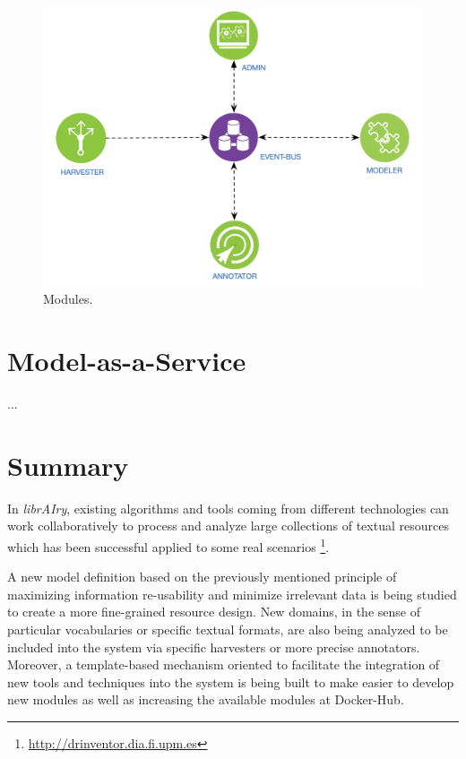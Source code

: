 \begin{figure}
  \includegraphics[scale=0.25]{modules}
  \caption{Modules.}
  \label{fig:librairy-modules}
\end{figure}


\section{Model-as-a-Service}
...

\section{Summary}

In \textit{librAIry}, existing algorithms and tools coming from different technologies can work collaboratively to process and analyze large collections of textual resources which has been successful applied to some real scenarios \footnote{\url{http://drinventor.dia.fi.upm.es}}.
 
A new model definition based on the previously mentioned principle of maximizing information re-usability and minimize irrelevant data is being studied to create a more fine-grained resource design. New domains, in the sense of particular vocabularies or specific textual formats, are also being analyzed to be included into the system via specific harvesters or more precise annotators. Moreover, a template-based mechanism oriented to facilitate the integration of new tools and techniques into the system is being built to make easier to develop new modules as well as increasing the available modules at Docker-Hub.